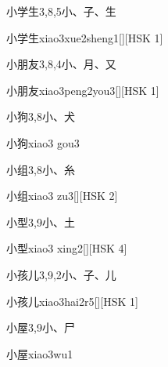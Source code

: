 \begin{entry}{小学生}{3,8,5}{⼩、⼦、⽣}
  \begin{phonetics}{小学生}{xiao3xue2sheng1}[][HSK 1]
  \end{phonetics}
\end{entry}

\begin{entry}{小朋友}{3,8,4}{⼩、⽉、⼜}
  \begin{phonetics}{小朋友}{xiao3peng2you3}[][HSK 1]
  \end{phonetics}
\end{entry}

\begin{entry}{小狗}{3,8}{⼩、⽝}
  \begin{phonetics}{小狗}{xiao3 gou3}
  \end{phonetics}
\end{entry}

\begin{entry}{小组}{3,8}{⼩、⽷}
  \begin{phonetics}{小组}{xiao3 zu3}[][HSK 2]
  \end{phonetics}
\end{entry}

\begin{entry}{小型}{3,9}{⼩、⼟}
  \begin{phonetics}{小型}{xiao3 xing2}[][HSK 4]
  \end{phonetics}
\end{entry}

\begin{entry}{小孩儿}{3,9,2}{⼩、⼦、⼉}
  \begin{phonetics}{小孩儿}{xiao3hai2r5}[][HSK 1]
  \end{phonetics}
\end{entry}

\begin{entry}{小屋}{3,9}{⼩、⼫}
  \begin{phonetics}{小屋}{xiao3wu1}
  \end{phonetics}
\end{entry}

